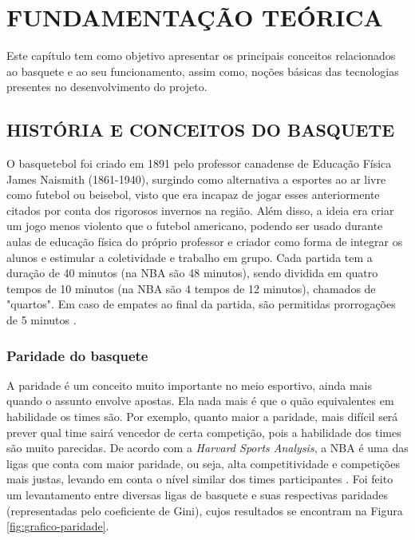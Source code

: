 \documentclass[brazilian]{ifsc-tcc}
\begin{document}

\chapter{FUNDAMENTAÇÃO TEÓRICA}
Este capítulo tem como objetivo apresentar os principais conceitos relacionados ao basquete e ao seu funcionamento, assim como, noções básicas das tecnologias presentes no desenvolvimento do projeto.

\section{HISTÓRIA E CONCEITOS DO BASQUETE} 
O basquetebol foi criado em 1891 pelo professor canadense de Educação Física James Naismith (1861-1940), surgindo como alternativa a esportes ao ar livre como futebol ou beisebol, visto que era incapaz de jogar esses anteriormente citados por conta dos rigorosos invernos na região. Além disso, a ideia era criar um jogo menos violento que o futebol americano, podendo ser usado durante aulas de educação física do próprio professor e criador como forma de integrar os alunos e estimular a coletividade e trabalho em grupo.
Cada partida tem a duração de 40 minutos (na NBA são 48 minutos), sendo dividida em quatro tempos de 10 minutos (na NBA são 4 tempos de 12 minutos), chamados de "quartos". Em caso de empates ao final da partida, são permitidas prorrogações de 5 minutos \cite{regra-tempo}.

\subsection{Paridade do basquete}
A paridade é um conceito muito importante no meio esportivo, ainda mais quando o assunto envolve apostas. Ela nada mais é que o quão equivalentes em habilidade os times são. Por exemplo, quanto maior a paridade, mais difícil será prever qual time sairá vencedor de certa competição, pois a habilidade dos times são muito parecidas. De acordo com a \textit{Harvard Sports Analysis}, a NBA é uma das ligas que conta com maior paridade, ou seja, alta competitividade e competições mais justas, levando em conta o nível similar dos times participantes \cite{paridade-basquete-harvard}. Foi feito um levantamento entre diversas ligas de basquete e suas respectivas paridades (representadas pelo coeficiente de Gini), cujos resultados se encontram na Figura \ref{fig:grafico-paridade}.
\end{document}
